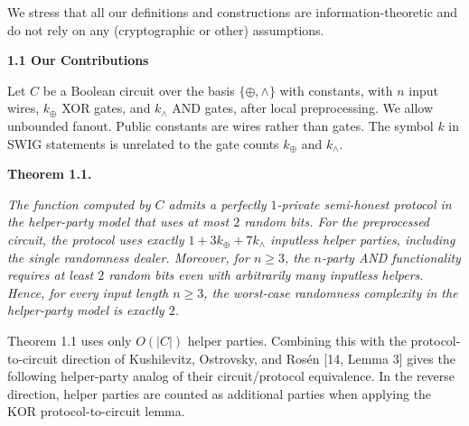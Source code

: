 \documentclass[10pt,a4paper]{article}
\begin{document}
We stress that all our definitions and constructions are information-theoretic and do not rely on any (cryptographic or other) assumptions.\par




\par\medskip\noindent\textbf{
1.1 Our Contributions}\par




Let $C$ be a Boolean circuit over the basis $\{\oplus,\wedge\}$ with constants, with $n$ input wires, $k_{\oplus}$ XOR gates, and $k_{\wedge}$ AND gates, after local preprocessing. We allow unbounded fanout. Public constants are wires rather than gates. The symbol $k$ in SWIG statements is unrelated to the gate counts $k_{\oplus}$ and $k_{\wedge}$.\par





\par\medskip\noindent\textbf{
\textbf{Theorem 1.1}\textbf{.}
}\par



\emph{The function computed by $C$ admits a perfectly $1$-private semi-honest protocol in the helper-party model that uses at most $2$ random bits. For the preprocessed circuit, the protocol uses exactly $1+3k_{\oplus}+7k_{\wedge}$ inputless helper parties, including the single randomness dealer.
Moreover, for $n\geq 3$, the $n$-party AND functionality requires at least $2$ random bits even with arbitrarily many inputless helpers. Hence, for every input length $n\geq 3$, the worst-case randomness complexity in the helper-party model is exactly $2$.}\par






Theorem 1.1 uses only $O(|C|)$ helper parties. Combining this with the protocol-to-circuit direction of Kushilevitz, Ostrovsky, and Rosén [14, Lemma 3] gives the following helper-party analog of their circuit/protocol equivalence. In the reverse direction, helper parties are counted as additional parties when applying the KOR protocol-to-circuit lemma.\par



\end{document}

